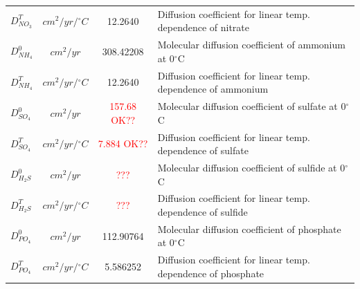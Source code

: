\documentclass[gmd, manuscript]{copernicus}
\begin{document}
\begin{table}[hbtp]
\begin{tabular}{l c c l}
$D_{NO_3}^T$ & $cm^2/yr/{}^{\circ}C$ & 12.2640 &Diffusion coefficient for linear temp. dependence of nitrate\\ %
$D_{NH_4}^0$ & $cm^2/yr$ & 308.42208 &Molecular diffusion coefficient of ammonium at 0$^\circ$C\\
$D_{NH_4}^T$ & $cm^2/yr/{}^{\circ}C$ & 12.2640 &Diffusion coefficient for linear temp. dependence of ammonium\\ %
$D_{SO_4}^0$ & $cm^2/yr$ & \textcolor{red}{157.68 OK??} &Molecular diffusion coefficient of sulfate at 0$^\circ$C\\
$D_{SO_4}^T$ & $cm^2/yr/{}^{\circ}C$ & \textcolor{red}{7.884 OK??} &Diffusion coefficient for linear temp. dependence of sulfate\\ %
$D_{H_2S}^0$ & $cm^2/yr$ & \textcolor{red}{???} &Molecular diffusion coefficient of sulfide at 0$^\circ$C\\
$D_{H_2S}^T$ & $cm^2/yr/{}^{\circ}C$ & \textcolor{red}{???} &Diffusion coefficient for linear temp. dependence of sulfide\\ %
$D_{PO_4}^0$ & $cm^2/yr$ & 112.90764 &Molecular diffusion coefficient of phosphate at 0$^\circ$C\\
$D_{PO_4}^T$ & $cm^2/yr/{}^{\circ}C$ & 5.586252 &Diffusion coefficient for linear temp. dependence of phosphate\\ %
\hline\hline
\end{tabular}
\label{table:sed-charac_transport-parameters}
\end{table}
\end{document}
